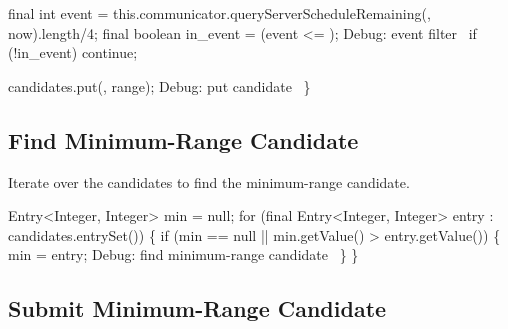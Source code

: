   final int event =
    this.communicator.queryServerScheduleRemaining(, now).length/4;
  final boolean in_event = (event <= );
  \LA{}Debug: event filter~{\nwtagstyle{}}\RA{}
  if (!in_event)
    continue;

  candidates.put(, range);
  \LA{}Debug: put candidate~{\nwtagstyle{}}\RA{}
\}
\nwendcode{}\nwdocspar

\subsection{Find Minimum-Range Candidate}

Iterate over the candidates to find the minimum-range candidate.

\nwenddocs{}\endmoddef\nwstartdeflinemarkup{}\nwenddeflinemarkup
Entry<Integer, Integer> min = null;
for (final Entry<Integer, Integer> entry : candidates.entrySet()) \{
  if (min == null || min.getValue() > entry.getValue()) \{
    min = entry;
    \LA{}Debug: find minimum-range candidate~{\nwtagstyle{}}\RA{}
  \}
\}
\nwendcode{}\nwdocspar

\subsection{Submit Minimum-Range Candidate}

